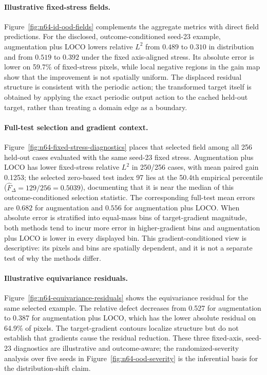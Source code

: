 \paragraph{Illustrative fixed-stress fields.} Figure~\ref{fig:n64-id-ood-fields} complements the aggregate metrics with direct field predictions. For the disclosed, outcome-conditioned seed-23 example, augmentation plus LOCO lowers relative \(L^2\) from \(0.489\) to \(0.310\) in distribution and from \(0.519\) to \(0.392\) under the fixed axis-aligned stress. Its absolute error is lower on 59.7\% of fixed-stress pixels, while local negative regions in the gain map show that the improvement is not spatially uniform. The displaced residual structure is consistent with the periodic action; the transformed target itself is obtained by applying the exact periodic output action to the cached held-out target, rather than treating a domain edge as a boundary.

\paragraph{Full-test selection and gradient context.} Figure~\ref{fig:n64-fixed-stress-diagnostics} places that selected field among all 256 held-out cases evaluated with the same seed-23 fixed stress. Augmentation plus LOCO has lower fixed-stress relative \(L^2\) in 250/256 cases, with mean paired gain 0.1253; the selected zero-based test index 97 lies at the 50.4th empirical percentile (\(\widehat F_\Delta=129/256=0.5039\)), documenting that it is near the median of this outcome-conditioned selection statistic. The corresponding full-test mean errors are \(0.682\) for augmentation and \(0.556\) for augmentation plus LOCO. When absolute error is stratified into equal-mass bins of target-gradient magnitude, both methods tend to incur more error in higher-gradient bins and augmentation plus LOCO is lower in every displayed bin. This gradient-conditioned view is descriptive: its pixels and bins are spatially dependent, and it is not a separate test of why the methods differ.

\paragraph{Illustrative equivariance residuals.} Figure~\ref{fig:n64-equivariance-residuals} shows the equivariance residual for the same selected example. The relative defect decreases from 0.527 for augmentation to 0.387 for augmentation plus LOCO, which has the lower absolute residual on 64.9\% of pixels. The target-gradient contours localize structure but do not establish that gradients cause the residual reduction. These three fixed-axis, seed-23 diagnostics are illustrative and outcome-aware; the randomized-severity analysis over five seeds in Figure~\ref{fig:n64-ood-severity} is the inferential basis for the distribution-shift claim.

